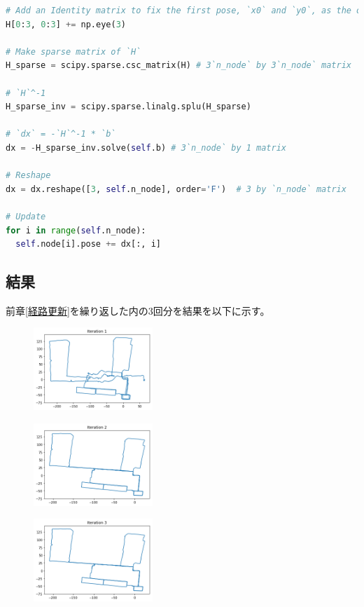 \documentclass{article}
\begin{document}
\begin{lstlisting}[language=python]
# Add an Identity matrix to fix the first pose, `x0` and `y0`, as the origin
H[0:3, 0:3] += np.eye(3)

# Make sparse matrix of `H`
H_sparse = scipy.sparse.csc_matrix(H) # 3`n_node` by 3`n_node` matrix

# `H`^-1
H_sparse_inv = scipy.sparse.linalg.splu(H_sparse)

# `dx` = -`H`^-1 * `b`
dx = -H_sparse_inv.solve(self.b) # 3`n_node` by 1 matrix

# Reshape
dx = dx.reshape([3, self.n_node], order='F')  # 3 by `n_node` matrix

# Update
for i in range(self.n_node):
  self.node[i].pose += dx[:, i]
\end{lstlisting}

\subsection{結果}

前章\ref{経路更新}を繰り返した内の3回分を結果を以下に示す。

\begin{figure}[h!]
  \centering
  \includegraphics[width=0.4\textwidth]{4-1_by_deleji_1.png}
\end{figure}

\begin{figure}[h!]
  \centering
  \includegraphics[width=0.4\textwidth]{4-2_by_deleji_2.png}
\end{figure}

\begin{figure}[h!]
  \centering
  \includegraphics[width=0.4\textwidth]{4-3_by_deleji_3.png}
\end{figure}
\end{document}
